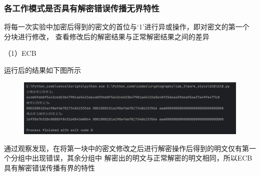 \documentclass[a4paper,11pt,UTF8]{ctexart}
\newcommand{\bottomcaption}{%
\setlength{\abovecaptionskip}{6pt}%
\setlength{\belowcaptionskip}{6pt}%
\caption}
\newcommand{\xiaowuhao}{\fontsize{9pt}{\baselineskip}\selectfont}   %
\begin{document}
        \subsubsection{各工作模式是否具有解密错误传播无界特性}
            将每一次实验中加密后得到的密文的首位与‘1’进行异或操作，即对密文的第一个分块进行修改，
            查看修改后的解密结果与正常解密结果之间的差异\par
            （1）ECB\par
                运行后的结果如下图所示
                \begin{figure}[H]
                    \centering
                    \includegraphics[width=13cm]{ECB_result_3.png}
                    \bottomcaption{\xiaowuhao{ECB修改一位密文后两次加密结果}}
                \end{figure}
                通过观察发现，在将第一块中的密文修改之后进行解密操作后得到的明文仅有第一个分组中出现错误，其余分组中
                解密出的明文与正常解密的明文相同，所以ECB具有解密错误传播有界的特性
                
\end{document}
